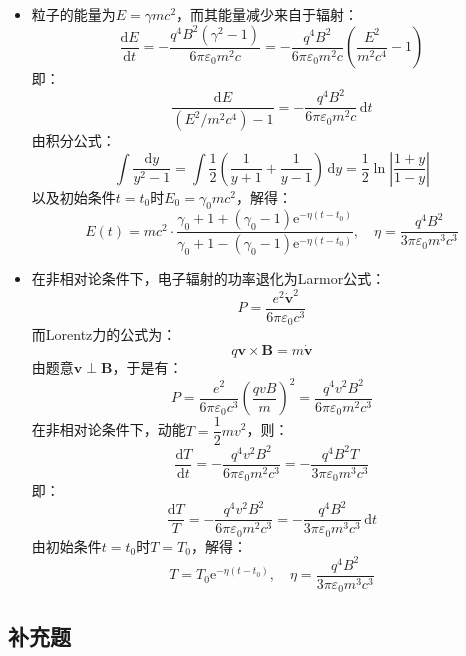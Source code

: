 \documentclass[a4paper,fontset=none]{ctexart}
\begin{document}
\begin{itemize}
    \item[9.(2)]
    粒子的能量为$E=\gamma mc^2$，而其能量减少来自于辐射：
    \[
        \frac{\mathrm{d}E}{\mathrm{d}t} = -\frac{q^4B^2(\gamma^2-1)}{6\pi\varepsilon_0m^2c} = -\frac{q^4B^2}{6\pi\varepsilon_0m^2c} \left(\frac{E^2}{m^2c^4}-1\right)
    \]
    即：
    \[
        \frac{\mathrm{d}E}{(E^2/m^2c^4)-1} = -\frac{q^4B^2}{6\pi\varepsilon_0m^2c}\,\mathrm{d}t
    \]
    由积分公式：
    \[
        \int \frac{\mathrm{d}y}{y^2-1} = \int \frac{1}{2}\left(\frac{1}{y+1} + \frac{1}{y-1}\right)\,\mathrm{d}y = \frac{1}{2}\ln\left|\frac{1+y}{1-y}\right|
    \]
    以及初始条件$t=t_0$时$E_0=\gamma_0mc^2$，解得：
    \[
        E(t) = mc^2 \cdot \frac{\gamma_0 + 1 + (\gamma_0 - 1)\mathrm{e}^{-\eta(t-t_0)}}{\gamma_0 + 1 - (\gamma_0 - 1)\mathrm{e}^{-\eta(t-t_0)}},\quad \eta = \frac{q^4B^2}{3\pi\varepsilon_0m^3c^3}
    \]

    \item[9.(3)]
    在非相对论条件下，电子辐射的功率退化为Larmor公式：
    \[
        P = \frac{e^2\dot{\bm{v}}^2}{6\pi\varepsilon_0c^3}
    \]
    而Lorentz力的公式为：
    \[
        q\bm{v} \times \bm{B} = m\dot{\bm{v}}
    \]
    由题意$\bm{v}\perp\bm{B}$，于是有：
    \[
        P = \frac{e^2}{6\pi\varepsilon_0c^3}\left(\frac{qvB}{m}\right)^2 = \frac{q^4v^2B^2}{6\pi\varepsilon_0m^2c^3}
    \]
    在非相对论条件下，动能$T=\dfrac{1}{2}mv^2$，则：
    \[
        \frac{\mathrm{d}T}{\mathrm{d}t} = -\frac{q^4v^2B^2}{6\pi\varepsilon_0m^2c^3} = -\frac{q^4B^2T}{3\pi\varepsilon_0m^3c^3}
    \]
    即：
    \[
        \frac{\mathrm{d}T}{T} = -\frac{q^4v^2B^2}{6\pi\varepsilon_0m^2c^3} = -\frac{q^4B^2}{3\pi\varepsilon_0m^3c^3}\,\mathrm{d}t
    \]
    由初始条件$t=t_0$时$T=T_0$，解得：
    \[
        T = T_0\mathrm{e}^{-\eta(t-t_0)},\quad \eta = \frac{q^4B^2}{3\pi\varepsilon_0m^3c^3}
    \]

\end{itemize}

\subsection*{补充题}
\end{document}
